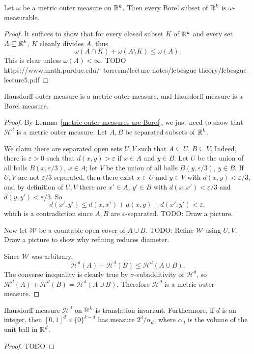 \begin{lemma}\label{metric outer measures are Borel}
Let $\omega$ be a metric outer measure on $\mathbb{R}^k$. Then every Borel subset of $\mathbb{R}^k$ is $\omega$-measurable.
\end{lemma}
\begin{proof}
It suffices to show that for every closed subset $K$ of $\mathbb{R}^k$ and every set $A \subseteq \mathbb{R}^k$, $K$ cleanly divides $A$, thus
$$\omega(A \cap K) + \omega(A \setminus K) \leq \omega(A).$$
This is clear unless $\omega(A) < \infty$.
TODO https://www.math.purdue.edu/~torresm/lecture-notes/lebesgue-theory/lebesgue-lecture5.pdf
\end{proof}

\begin{theorem}
Hausdorff outer measure is a metric outer measure, and Hausdorff measure is a Borel measure.
\end{theorem}
\begin{proof}
By Lemma~\ref{metric outer measures are Borel}, we just need to show that $\mathcal H^d$ is a metric outer measure.
Let $A,B$ be separated subsets of $\mathbb{R}^k$.

We claim there are separated open sets $U,V$ such that $A \subseteq U$, $B \subseteq V$.
Indeed, there is $\varepsilon > 0$ such that $d(x, y) > \varepsilon$ if $x \in A$ and $y \in B$.
Let $U$ be the union of all balls $B(x, \varepsilon/3)$, $x \in A$; let $V$ be the union of all balls $B(y, \varepsilon/3)$, $y \in B$.
If $U,V$ are not $\varepsilon/3$-separated, then there exist $x \in U$ and $y \in V$ with $d(x, y) < \varepsilon/3$, and by definition of $U,V$ there are $x' \in A$, $y' \in B$ with $d(x, x') < \varepsilon/3$ and $d(y, y') < \varepsilon/3$.
So
$$d(x', y') \leq d(x, x') + d(x, y) + d(x', y') < \varepsilon,$$
which is a contradiction since $A,B$ are $\varepsilon$-separated. TODO: Draw a picture.

Now let $\mathcal W$ be a countable open cover of $A \cup B$.
TODO: Refine $\mathcal W$ using $U,V$. Draw a picture to show why refining reduces diameter.

Since $\mathcal W$ was arbitrary,
$$\mathcal H^d(A) + \mathcal H^d(B) \leq \mathcal H^d(A \cup B).$$
The converse inequality is clearly true by $\sigma$-subadditivity of $\mathcal H^d$, so $\mathcal H^d(A) + \mathcal H^d(B) = \mathcal H^d(A \cup B)$.
Therefore $\mathcal H^d$ is a metric outer measure.
\end{proof}

\begin{theorem}
Hausdorff measure $\mathcal H^d$ on $\mathbb{R}^k$ is translation-invariant.
Furthermore, if $d$ is an integer, then $[0, 1]^d \times \{0\}^{k - d}$ has measure $2^d/\alpha_d$, where $\alpha_d$ is the volume of the unit ball in $\mathbb{R}^d$.
\end{theorem}
\begin{proof}
TODO
\end{proof}

